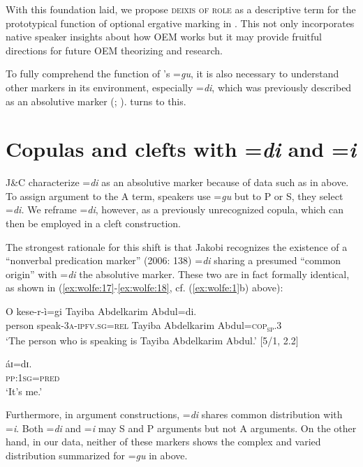 \documentclass[output=paper,modfonts]{langscibook}
\begin{document}
With this foundation laid, we propose \textsc{deixis of role} as a descriptive term for the prototypical function of optional ergative marking in . This not only incorporates native speaker insights about how  OEM works but it may provide fruitful directions for future OEM theorizing and research. 

To fully comprehend the function of ’s =\textit{gu}, it is also necessary to understand other  markers in its environment, especially =\textit{di}, which was previously described as an absolutive  marker (\citealt[151--154]{JakobiCrass2004}; \citealt{Jakobi2006}).  turns to this.

\section{Copulas and clefts with =\textit{di} and =\textit{i}}\label{sec:wolfe:4}
J\&C characterize =\textit{di} as an absolutive  marker because of data such as in  above. To assign argument  to the A term,  speakers use =\textit{gu} but to  P or S, they select =\textit{di.} We reframe =\textit{di}, however, as a previously unrecognized copula, which can then be employed in a cleft construction.

The strongest rationale for this shift is that Jakobi recognizes the existence of a “nonverbal predication marker” (2006: 138) =\textit{di} sharing a presumed “common origin” with =\textit{di} the absolutive  marker. These two are in fact formally identical, as shown in (\ref{ex:wolfe:17}-\ref{ex:wolfe:18}, cf. (\ref{ex:wolfe:1}b) above):

\ea\label{ex:wolfe:17}
\gll O kese-r-ì=gi Tayiba Abdelkarim Abdul=di.\\
     person speak-\textsc{3}\textsc{a}-\textsc{ipfv}.\textsc{sg}=\textsc{rel} Tayiba Abdelkarim Abdul=\textsc{cop}\textsc{\textsubscript{sp}}\textsc{.3}\\
\glt ‘The person who is speaking is Tayiba Abdelkarim Abdul.’ [5/1, 2.2]
\z

\ea\label{ex:wolfe:18}
\gll áɪ=dɪ.\\
     \textsc{pp}:\textsc{1sg}=\textsc{pred}\\
\glt ‘It’s me.’ \citep[138]{Jakobi2006}
\z

Furthermore, in argument  constructions, =\textit{di} shares common distribution with =\textit{i}. Both =\textit{di} and =\textit{i} may  S and P arguments but not A arguments. On the other hand, in our data, neither of these markers shows the complex and varied distribution summarized for =\textit{gu} in  above. 
\end{document}
